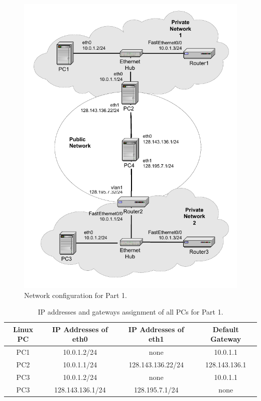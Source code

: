 \begin{figure}[ht]
	\centering
	\includegraphics{graphics/lab7-part1-updated.pdf}	
	\caption{Network configuration for Part 1.}
	\label{fig:lab7-part1-network}
\end{figure}

\begin{table}[h!t]
	\centering
	\begin{tabular}{| c | c | c | c |}	
		\hline
		\textbf{Linux PC} & \textbf{IP Addresses of eth0} & \textbf{IP Addresses of eth1} & \textbf{Default Gateway} \\ \hline
		PC1 & 10.0.1.2/24 & none & 10.0.1.1 \\ 
		PC2 & 10.0.1.1/24 & 128.143.136.22/24 & 128.143.136.1 \\
		PC3 & 10.0.1.2/24 & none & 10.0.1.1 \\
		PC3 & 128.143.136.1/24 & 128.195.7.1/24 & none \\ \hline
	\end{tabular}
	\caption{IP addresses and gateways assignment of all PCs for Part 1.}
	\label{tab:lab7-part1-ip-addresses-pc}
\end{table}

